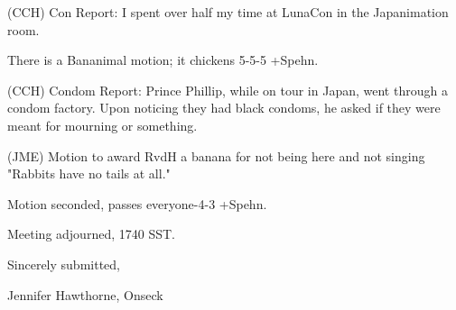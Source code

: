 \documentclass[12pt]{article}
\begin{document}
(CCH) Con Report: I spent over half my time at LunaCon in the Japanimation room.

There is a Bananimal motion; it chickens 5-5-5 +Spehn.

(CCH) Condom Report: Prince Phillip, while on tour in Japan, went through a condom factory. Upon noticing they had black condoms, he asked if they were meant for mourning or something.

(JME) Motion to award RvdH a banana for not being here and not singing "Rabbits have no tails at all."

Motion seconded, passes everyone-4-3 +Spehn.

\vspace{12pt}

\noindent
Meeting adjourned, 1740 SST.

\vspace{18pt}

\centerline{Sincerely submitted,}
\centerline{Jennifer Hawthorne, Onseck}
\end{document}
